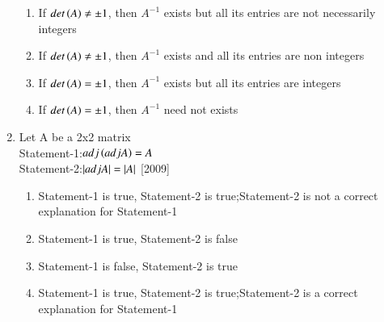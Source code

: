 \documentclass[journal,12pt,twocolumn]{IEEEtran}
\theoremstyle{remark}
\begin{document}
\begin{enumerate}
		\begin{enumerate}
			\item If $det\left(A\right)\neq\pm1$, then $A^{-1}$ exists but all its entries are not necessarily integers
			\item If $det\left(A\right)\neq\pm1$, then $A^{-1}$ exists and all its entries are non integers
			\item If $det\left(A\right)=\pm1$, then $A^{-1}$ exists but all its entries are integers
			\item If $det\left(A\right)=\pm1$, then $A^{-1}$ need not exists \\
		\end{enumerate}
	\item Let A be a 2x2 matrix \\
		Statement-1:$adj\left(adjA\right) = A$ \\
		Statement-2:$\left\vert adjA\right\vert = \left\vert A\right\vert$ \hfill{[2009]}
		\begin{enumerate}
			\item Statement-1 is true, Statement-2 is true;Statement-2 is not a correct explanation for Statement-1
			\item Statement-1 is true, Statement-2 is false
			\item Statement-1 is false, Statement-2 is true
			\item Statement-1 is true, Statement-2 is true;Statement-2 is a correct explanation for Statement-1
		\end{enumerate}

\end{enumerate}
\end{document}

